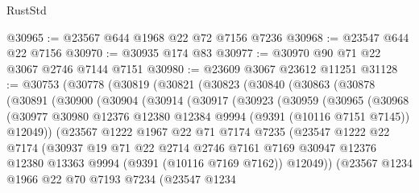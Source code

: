 \begin{lexlean}{RustStd}
\begin{coremodule}
@30965 := @23567 @644 @1968 @22 @72 @7156 @7236
@30968 := @23547 @644 @22 @7156
@30970 := @30935 @174 @83
@30977 := @30970 @90 @71 @22 @3067 @2746 @7144 @7151
@30980 := @23609 @3067 @23612 @11251
@31128 := @30753
    (@30778
      (@30819
        (@30821
          (@30823
            (@30840
              (@30863
                (@30878
                  (@30891
                    (@30900
                      (@30904
                        (@30914
                          (@30917
                            (@30923
                              (@30959
                                (@30965
                                  (@30968
                                    (@30977
                                      @30980
                                      @12376
                                      @12380
                                      @12384
                                      @9994
                                      (@9391 (@10116 @7151 @7145))
                                      @12049))
                                  (@23567
                                    @1222
                                    @1967
                                    @22
                                    @71
                                    @7174
                                    @7235
                                    (@23547
                                      @1222
                                      @22
                                      @7174
                                      (@30937
                                        @19
                                        @71
                                        @22
                                        @2714
                                        @2746
                                        @7161
                                        @7169
                                        @30947
                                        @12376
                                        @12380
                                        @13363
                                        @9994
                                        (@9391 (@10116 @7169 @7162))
                                        @12049))
                                    (@23567
                                      @1234
                                      @1966
                                      @22
                                      @70
                                      @7193
                                      @7234
                                      (@23547
                                        @1234

\end{coremodule}
\end{lexlean}
